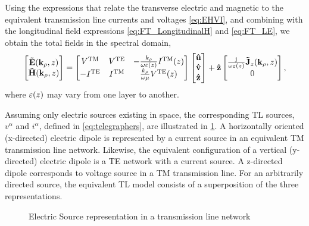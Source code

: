 \documentclass[12pt]{article}
\begin{document}
Using the expressions that relate the transverse electric and magnetic to the equivalent transmission line currents and voltages \eqref{eq:EHVI}, and combining with the longitudinal field expressions \eqref{eq:FT_LongitudinalH} and \eqref{eq:FT_LE}, we obtain the total fields in the spectral domain,
%
%
\begin{equation}
  \begin{bmatrix}
    \mathbf{\tilde{E}}(\mathbf{k}_{\rho},z) \\
    \mathbf{\tilde{H}}(\mathbf{k}_{\rho},z)
  \end{bmatrix}
  =
  \begin{bmatrix}
    V^{\mathrm{TM}} & V^{\mathrm{TE}} & -\frac{k_{\rho}}{\omega \varepsilon(z)}   I^{\mathrm{TM}}(z) \\
    -I^{\mathrm{TE}} & I^{\mathrm{TM}} & \frac{k_{\rho}}{\omega \mu}   V^{\mathrm{TE}}(z)
  \end{bmatrix}
  \begin{bmatrix}
    \mathbf{\hat u} \\
    \mathbf{\hat v} \\
    \mathbf{\hat z} \\
  \end{bmatrix} + \mathbf{\hat z}
  \begin{bmatrix}
    \frac{\mathrm{j}\mkern1mu}{\omega \varepsilon(z)}     \mathbf{\tilde{J}}_z(\mathbf{k}_{\rho},z) \\
    0
  \end{bmatrix}
  \label{eq:totalEHVI},
\end{equation}
%
where $\varepsilon(z)$ may vary from one layer to another.

Assuming only electric sources existing in space, the corresponding TL sources, $v^{\alpha}$ and $i^{\alpha}$, defined in \eqref{eq:telegraphers}, are illustrated in \ref{fig:J_sources}. A horizontally oriented (x-directed) electric dipole is represented by a current source in an equivalent TM transmission line network. Likewise, the equivalent configuration of a vertical (y-directed) electric dipole is a TE network with a current source. A z-directed dipole corresponds to voltage source in a TM transmission line. For an arbitrarily directed source, the equivalent TL model consists of a superposition of the three representations.
%
\begin{figure}[h!]
  \centering
  \def\svgwidth{.75\linewidth}
  
  \caption{Electric Source representation in a transmission line network}
  \label{fig:J_sources}
\end{figure}
%
\end{document}
